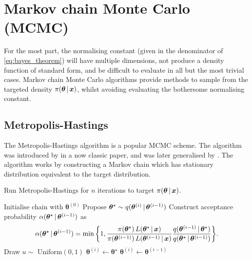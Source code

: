 \section{Markov chain Monte Carlo (MCMC)}
\label{sec:mcmc}

For the most part, the normalising constant (given in the denominator of
\cref{eq:bayes_theorem}) will have multiple dimensions, not produce a density function of
standard form, and be difficult to evaluate in all but the most trivial cases. Markov
chain Monte Carlo algorithms provide methods to sample from the targeted density
$\pi(\bm{\theta} \,|\, \bm{x})$, whilst avoiding evaluating the bothersome normalising
constant.

\subsection{Metropolis-Hastings}
\label{ssec:metropolis_hastings}

The Metropolis-Hastings algorithm is a popular MCMC scheme. The algorithm was introduced
by \textcite{metropolis53} in a now classic paper, and was later generalised by
\textcite{hastings70}. The algorithm works by constructing a Markov chain which has
stationary distribution equivalent to the target distribution.

\begin{algorithm}
  \caption{Run Metropolis-Hastings for $n$ iterations to target $\pi(\bm{\theta} \,|\,
           \bm{x})$.}
  \label{alg:metropolis_hastings}
  \begin{algorithmic}[1]
    \State Initialise chain with $\bm{\theta}^{(0)}$
      \State Propose ${\bm{\theta}}^\star \sim q(\bm{\theta}^{(i)} \,|\, \bm{\theta}^{(i-1)})$
      \State Construct acceptance probability $\alpha(\bm{\theta}^\star \,|\, \bm{\theta}^{(i-1)})$ as
      \begin{equation*}
          \alpha(\bm{\theta}^\star \given \bm{\theta}^{(i-1)}) =
        \min\bigg\{1,
        \frac{\pi(\bm{\theta}^\star) \, L(\bm{\theta}^\star \given \bm{x})}%
        {\pi(\bm{\theta}^{(i-1)}) \, L(\bm{\theta}^{(i-1)} \given \bm{x})}
        \frac{q(\bm{\theta}^{(i-1)} \given \bm{\theta}^\star)}%
        {q(\bm{\theta}^\star \given \bm{\theta}^{(i-1)})}
        \bigg\}.
      \end{equation*}
      \State Draw $u \sim$ Uniform$(0, 1)$
        \State {}
        \State $\bm{\theta}^{(i)} \leftarrow \bm{\theta}^\star$
      \Else
        \State {}
        \State $\bm{\theta}^{(i)} \leftarrow \bm{\theta}^{(i-1)}$
      \EndIf
    \EndFor
  \end{algorithmic}
\end{algorithm}

